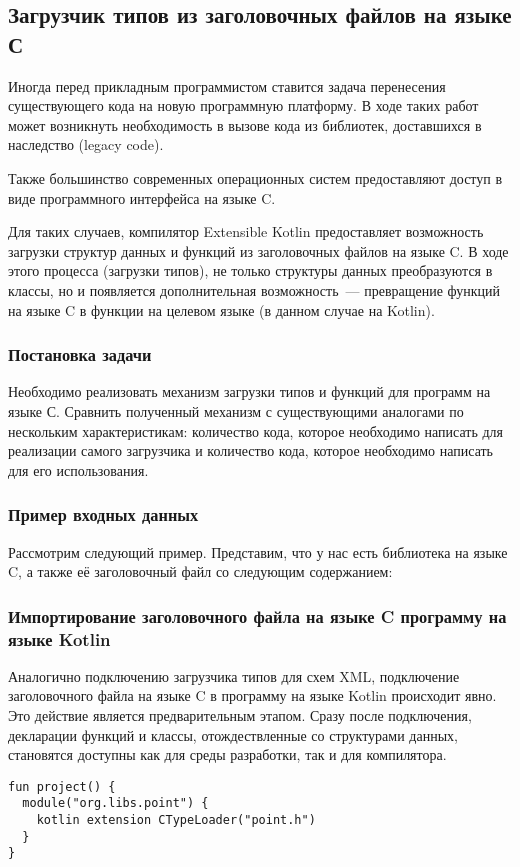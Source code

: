 \subsection{Загрузчик типов из заголовочных файлов на языке С}\label{c-loader}
Иногда перед прикладным программистом ставится задача перенесения существующего кода на новую программную платформу.
В ходе таких работ может возникнуть необходимость в вызове кода из библиотек, доставшихся в наследство (legacy code).

Также большинство современных операционных систем предоставляют доступ в виде программного интерфейса на языке C.

Для таких случаев, компилятор Extensible Kotlin предоставляет возможность загрузки структур данных и функций из заголовочных файлов на языке C.
В ходе этого процесса (загрузки типов), не только структуры данных преобразуются в классы, но и появляется дополнительная возможность~--- превращение функций на языке C в функции на целевом языке (в данном случае на Kotlin).

\subsubsection{Постановка задачи}
\td Необходимо реализовать механизм загрузки типов и функций для программ на языке С.
Сравнить полученный механизм с существующими аналогами по нескольким характеристикам: количество кода, которое необходимо написать для реализации самого загрузчика и количество кода, которое необходимо написать для его использования.

\begin{code}
\subsubsection{Пример входных данных}
Рассмотрим следующий пример. Представим, что у нас есть библиотека на языке C, а также её заголовочный файл со следующим содержанием:

\end{code}

\subsubsection{Импортирование заголовочного файла на языке C программу на языке Kotlin}
Аналогично подключению загрузчика типов для схем XML, подключение заголовочного файла на языке C в программу на языке Kotlin происходит явно.
Это действие является предварительным этапом. Сразу после подключения, декларации функций и классы, отождествленные со структурами данных, становятся доступны как для среды разработки, так и для компилятора.
\begin{code}\begin{lstlisting}[caption={Подключение заголовочного файла на языке C в программу на языке Kotlin.}, label={c-type-loading-extension-point}]
fun project() {
  module("org.libs.point") {
    kotlin extension CTypeLoader("point.h")
  }
}
\end{lstlisting}\end{code}

